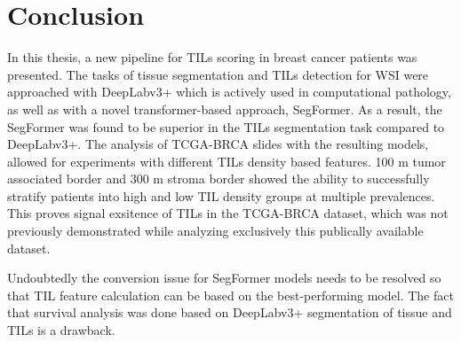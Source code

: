\chapter{Conclusion}
In this thesis, a new pipeline for TILs scoring in breast cancer patients was presented.
The tasks of tissue segmentation and TILs detection for WSI were approached with DeepLabv3+
which is actively used in computational pathology, as well as with a novel transformer-based
approach, SegFormer. As a result, the SegFormer was found to be superior in the TILs
segmentation task compared to DeepLabv3+. The analysis of TCGA-BRCA slides with the resulting models, allowed
for experiments with different TILs density based features. 100 \textmu m tumor associated border and
300 \textmu m stroma border showed the
ability to successfully stratify patients into high and low TIL density groups at multiple prevalences. This proves signal exsitence
of TILs in the TCGA-BRCA dataset, which was not previously demonstrated while
analyzing exclusively this publically available dataset. 

Undoubtedly the conversion issue for SegFormer models needs to be resolved so that TIL feature calculation can be based on
the best-performing model. The fact that survival analysis was done based on DeepLabv3+ segmentation of tissue and TILs is
a drawback. 

